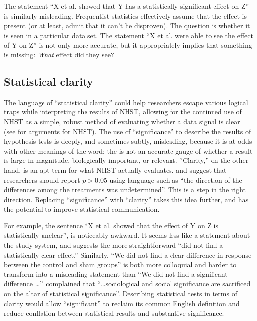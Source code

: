 The statement ``X et al. showed that Y has a statistically significant effect on Z'' is similarly misleading. Frequentist statistics effectively assume that the effect is present (or at least, admit that it can't be disproven). The question is whether it is seen in a particular data set. The statement ``X et al. were able to see the effect of Y on Z'' is not only more accurate, but it appropriately implies that something is missing: \emph{What} effect did they see?

\subsection*{Statistical clarity}

\noindent The language of ``statistical clarity'' could help researchers escape various logical traps while interpreting the results of NHST, allowing for the continued use of NHST as a simple, robust method of evaluating whether a data signal is clear (see \cite{Abelson1997} for arguments for NHST). The use of ``significance'' to describe the results of hypothesis tests is deeply, and sometimes subtly, misleading, because it is at odds with other meanings of the word: the \pval is not an accurate gauge of whether a result is large in magnitude, biologically important, or relevant. ``Clarity,'' on the other hand, is an apt term for what NHST actually evaluates. \citet{jones2000sensible} and \citet{robinson2001past} suggest that researchers should report $p > 0.05$ using language such as ``the direction of the differences among the treatments was undetermined''. This is a step in the right direction. Replacing ``significance'' with ``clarity'' takes this idea further, and has the potential to improve statistical communication.

For example, the sentence ``X et al. showed that the effect of Y on Z is statistically unclear'', is noticeably awkward. It seems less like a statement about the study system, and suggests the more straightforward ``did not find a statistically clear effect.'' Similarly, ``We did not find a clear difference in response between the control and sham groups'' is both more colloquial and harder to transform into a misleading statement than ``We did not find a significant difference \ldots''. \citet{Bernardietal.2017} complained that ``\ldots sociological and social significance are sacrificed on the altar of statistical significance''. Describing statistical tests in terms of clarity would allow ``significant'' to reclaim its common English definition and reduce conflation between statistical results and substantive significance.

